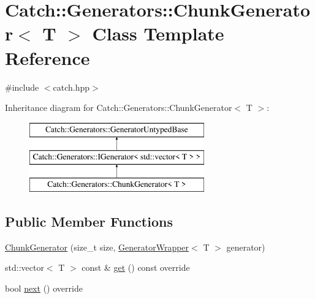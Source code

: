 \hypertarget{class_catch_1_1_generators_1_1_chunk_generator}{}\section{Catch\+::Generators\+::Chunk\+Generator$<$ T $>$ Class Template Reference}
\label{class_catch_1_1_generators_1_1_chunk_generator}


{\ttfamily \#include $<$catch.\+hpp$>$}

Inheritance diagram for Catch\+::Generators\+::Chunk\+Generator$<$ T $>$\+:\begin{figure}[H]
\begin{center}
\leavevmode
\includegraphics[height=3.000000cm]{class_catch_1_1_generators_1_1_chunk_generator}
\end{center}
\end{figure}
\subsection*{Public Member Functions}
\begin{DoxyCompactItemize}
\item 
\mbox{\hyperlink{class_catch_1_1_generators_1_1_chunk_generator_a50c334d00cde3166d71e9b90ebc2d2e3}{Chunk\+Generator}} (size\+\_\+t size, \mbox{\hyperlink{class_catch_1_1_generators_1_1_generator_wrapper}{Generator\+Wrapper}}$<$ T $>$ generator)
\item 
std\+::vector$<$ T $>$ const  \& \mbox{\hyperlink{class_catch_1_1_generators_1_1_chunk_generator_aa41c7d08a165b6a18560f2ab9e977f0b}{get}} () const override
\item 
bool \mbox{\hyperlink{class_catch_1_1_generators_1_1_chunk_generator_a545e89f80eb1e3c953491541ea083f86}{next}} () override
\end{DoxyCompactItemize}
